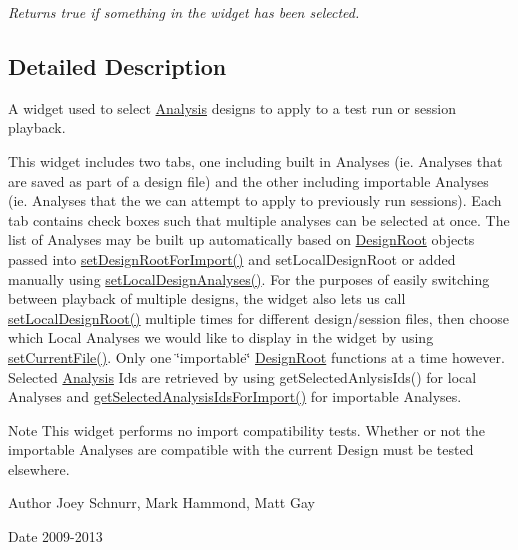 \begin{DoxyCompactItemize}
\begin{DoxyCompactList}\small\item\em Returns true if something in the widget has been selected. \end{DoxyCompactList}\end{DoxyCompactItemize}


\subsection{Detailed Description}
A widget used to select \hyperlink{class_picto_1_1_analysis}{Analysis} designs to apply to a test run or session playback. 

This widget includes two tabs, one including built in Analyses (ie. Analyses that are saved as part of a design file) and the other including importable Analyses (ie. Analyses that the we can attempt to apply to previously run sessions). Each tab contains check boxes such that multiple analyses can be selected at once. The list of Analyses may be built up automatically based on \hyperlink{class_picto_1_1_design_root}{Design\-Root} objects passed into \hyperlink{class_picto_1_1_analysis_selector_widget_a0467f2bfe3c50f37d30e427dd9c66736}{set\-Design\-Root\-For\-Import()} and set\-Local\-Design\-Root or added manually using \hyperlink{class_picto_1_1_analysis_selector_widget_a9d5fc6429780f442dcf4dbe39cc61b75}{set\-Local\-Design\-Analyses()}. For the purposes of easily switching between playback of multiple designs, the widget also lets us call \hyperlink{class_picto_1_1_analysis_selector_widget_ad0ecc27ca19d88c0b90d6dcc2c17f270}{set\-Local\-Design\-Root()} multiple times for different design/session files, then choose which Local Analyses we would like to display in the widget by using \hyperlink{class_picto_1_1_analysis_selector_widget_aa910d097fe96b75120114e8e1b29df19}{set\-Current\-File()}. Only one \char`\"{}importable\char`\"{} \hyperlink{class_picto_1_1_design_root}{Design\-Root} functions at a time however. Selected \hyperlink{class_picto_1_1_analysis}{Analysis} Ids are retrieved by using get\-Selected\-Anlysis\-Ids() for local Analyses and \hyperlink{class_picto_1_1_analysis_selector_widget_a7ee81957d535d561f13916e24b07a116}{get\-Selected\-Analysis\-Ids\-For\-Import()} for importable Analyses. \begin{DoxyNote}{Note}
This widget performs no import compatibility tests. Whether or not the importable Analyses are compatible with the current Design must be tested elsewhere. 
\end{DoxyNote}
\begin{DoxyAuthor}{Author}
Joey Schnurr, Mark Hammond, Matt Gay 
\end{DoxyAuthor}
\begin{DoxyDate}{Date}
2009-\/2013 
\end{DoxyDate}


